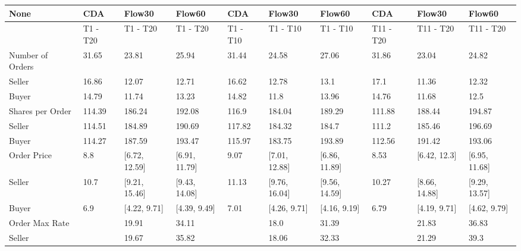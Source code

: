 \begin{tabular}{llllllllll}
\hline
 None                   & CDA      & Flow30        & Flow60        & CDA      & Flow30        & Flow60        & CDA       & Flow30        & Flow60        \\
\hline
                        & T1 - T20 & T1 - T20      & T1 - T20      & T1 - T10 & T1 - T10      & T1 - T10      & T11 - T20 & T11 - T20     & T11 - T20     \\
 Number of Orders       & 31.65    & 23.81         & 25.94         & 31.44    & 24.58         & 27.06         & 31.86     & 23.04         & 24.82         \\
 Seller                 & 16.86    & 12.07         & 12.71         & 16.62    & 12.78         & 13.1          & 17.1      & 11.36         & 12.32         \\
 Buyer                  & 14.79    & 11.74         & 13.23         & 14.82    & 11.8          & 13.96         & 14.76     & 11.68         & 12.5          \\
 Shares per Order       & 114.39   & 186.24        & 192.08        & 116.9    & 184.04        & 189.29        & 111.88    & 188.44        & 194.87        \\
 Seller                 & 114.51   & 184.89        & 190.69        & 117.82   & 184.32        & 184.7         & 111.2     & 185.46        & 196.69        \\
 Buyer                  & 114.27   & 187.59        & 193.47        & 115.97   & 183.75        & 193.89        & 112.56    & 191.42        & 193.06        \\
 Order Price            & 8.8      & [6.72, 12.59] & [6.91, 11.79] & 9.07     & [7.01, 12.88] & [6.86, 11.89] & 8.53      & [6.42, 12.3]  & [6.95, 11.68] \\
 Seller                 & 10.7     & [9.21, 15.46] & [9.43, 14.08] & 11.13    & [9.76, 16.04] & [9.56, 14.59] & 10.27     & [8.66, 14.88] & [9.29, 13.57] \\
 Buyer                  & 6.9      & [4.22, 9.71]  & [4.39, 9.49]  & 7.01     & [4.26, 9.71]  & [4.16, 9.19]  & 6.79      & [4.19, 9.71]  & [4.62, 9.79]  \\
 Order Max Rate         &          & 19.91         & 34.11         &          & 18.0          & 31.39         &           & 21.83         & 36.83         \\
 Seller                 &          & 19.67         & 35.82         &          & 18.06         & 32.33         &           & 21.29         & 39.3          \\

\end{tabular}
